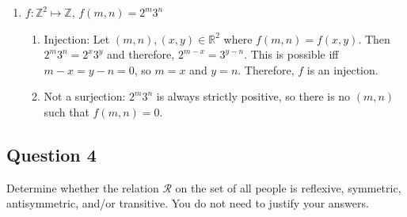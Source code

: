 \documentclass{article}
\begin{document}
\begin{enumerate}
\begin{mdframed}
\begin{enumerate}
        $m = 2ni = x - 2yi$, so $m = x$ and $-2ni = -2yi \rightarrow ni = yi \rightarrow n = y$. This is because real numbers are closed under addition and multiplication by a real number and imaginary numbers are closed under addition and multiplication by a real number.
        \item Surjection: Let $a + bi \in \mathbb{C}$ by any member of the range. Then consider $(a, \mathbb{-b}{2} \in \mathbb{R^2}$. Then $f(a, -b/2) = a + bi$, so there exists an element in the domain that maps to $a + bi$ for any $a + bi \in \mathbb{C}$.
    \end{enumerate}
    \end{mdframed}
    \item $f: \mathbb{Z}^2 \mapsto \mathbb{Z}$, $f(m, n) = 2^m3^n$
    \begin{mdframed}
    \begin{enumerate}
        \item Injection: Let $(m, n), (x, y) \in \mathbb{R}^2$ where $f(m, n) = f(x, y)$. Then $2^m3^n = 2^x3^y$ and therefore, $2^{m-x} = 3^{y-n}$. This is possible iff $m - x = y - n = 0$, so $m = x$ and $y = n$. Therefore, $f$ is an injection.
        \item Not a surjection: $2^m3^n$ is always strictly positive, so there is no $(m, n)$ such that $f(m, n) = 0$.
    \end{enumerate}
    \end{mdframed}

\end{enumerate}


\subsection*{Question 4}
Determine whether the relation $\mathcal{R}$ on the set of all people is reflexive, symmetric, antisymmetric, and/or transitive. You do not need to justify your answers.\\
\end{document}
